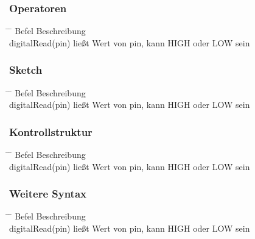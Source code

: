 \documentclass[10pt,a4paper,oneside]{article}
\begin{document}
\subsubsection{Operatoren}
\begin{tabbing}
  \hspace*{1mm} \=\hspace{50mm} \= \kill
  \>Befel \>Beschreibung \\
  \>digitalRead(pin) \> ließt Wert von pin, kann HIGH oder LOW sein \\
\end{tabbing}


\subsubsection{Sketch}
\begin{tabbing}
  \hspace*{1mm} \=\hspace{50mm} \= \kill
  \>Befel \>Beschreibung \\
  \>digitalRead(pin) \> ließt Wert von pin, kann HIGH oder LOW sein \\
\end{tabbing}


\subsubsection{Kontrollstruktur}
\begin{tabbing}
  \hspace*{1mm} \=\hspace{50mm} \= \kill
  \>Befel \>Beschreibung \\
  \>digitalRead(pin) \> ließt Wert von pin, kann HIGH oder LOW sein \\
\end{tabbing}


\subsubsection{Weitere Syntax}
\begin{tabbing}
  \hspace*{1mm} \=\hspace{50mm} \= \kill
  \>Befel \>Beschreibung \\
  \>digitalRead(pin) \> ließt Wert von pin, kann HIGH oder LOW sein \\
\end{tabbing}
\end{document}
